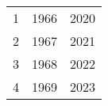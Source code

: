 % 
\begin{tabular}{ccc}
  \hline
  \hline
1 & 1966 & 2020 \\ 
  2 & 1967 & 2021 \\ 
  3 & 1968 & 2022 \\ 
  4 & 1969 & 2023 \\ 
   \hline
\end{tabular}
